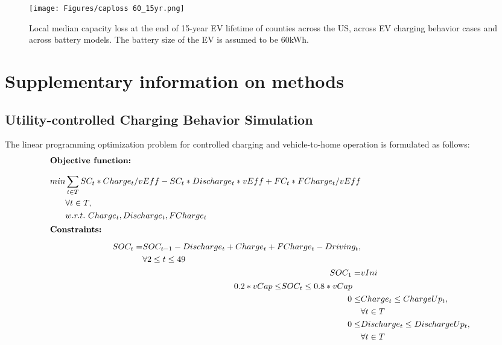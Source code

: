\documentclass[11pt,preprint]{elsarticle}
\begin{document}
\begin{figure}[H]
    \centering 
    \texttt{[image: Figures/caploss 60\_15yr.png]} 
    \caption{Local median capacity loss at the end of 15-year EV lifetime of counties across the US, across EV charging behavior cases and across battery models. The battery size of the EV is assumed to be 60kWh.} 
    \label{fig:caploss60} 
\end{figure}

\newpage

\section{Supplementary information on methods}

\subsection{Utility-controlled Charging Behavior Simulation}

The linear programming optimization problem for controlled charging and vehicle-to-home operation is formulated as follows:\\

\begin{align}
\intertext{\smallskip\newline \textbf{Objective function:}  \smallskip\newline}
\begin{split}\label{eq:1}
    min{}& \sum_{t\in T}{SC_{t}*Charge_{t}/vEff-SC_{t}*Discharge_{t}*vEff+FC_{t}*FCharge_{t}/vEff}\\
        & \forall t \in T, \\
        & w.r.t.\text{ } Charge_{t},Discharge_{t},FCharge_{t}
\end{split}\\
\intertext{\smallskip\newline \textbf{Constraints:} \smallskip\newline} 
\begin{split}\label{eq:SOC}
    SOC_{t} = & SOC_{t-1} - Discharge_{t} + Charge_{t}+FCharge_{t}-Driving_{t},\\
    &\forall 2 \leq t \leq 49
\end{split}\\
    SOC_{1} = & vIni \label{eq:ini}\\
\begin{split}\label{eq:socrange}
    0.2 * vCap \leq &SOC_{t} \leq 0.8* vCap
\end{split}\\
0 \leq & Charge_{t} \leq ChargeUp_{t},\label{eq:charg}\\
&\forall t \in T\\
0 \leq & Discharge_{t} \leq DischargeUp_{t},\label{eq:disc}\\
&\forall t \in T
\end{align}
\end{document}
